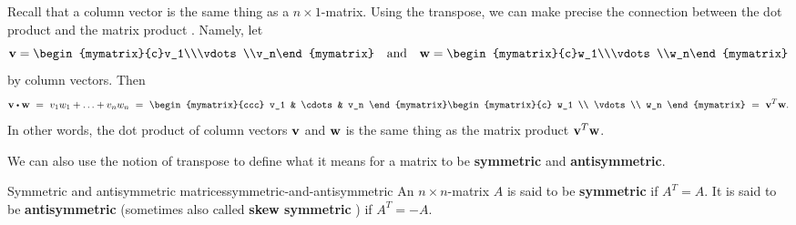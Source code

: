 Recall that a column vector is the same thing as a $n\times
1$-matrix. Using the transpose, we can make precise the connection
between the dot product and the matrix product%
%
. Namely, let
\begin{equation*}
  \vect{v}=\begin{mymatrix}{c}v_1\\\vdots\\v_n\end{mymatrix}
  \quad\mbox{and}\quad
  \vect{w}=\begin{mymatrix}{c}w_1\\\vdots\\w_n\end{mymatrix}
\end{equation*}
by column vectors. Then
\begin{equation*}
  \vect{v}\dotprod\vect{w}
  ~=~
  v_1w_1 + \ldots + v_nw_n
  ~=~
  \begin{mymatrix}{ccc} v_1 & \cdots & v_n \end{mymatrix}
  \begin{mymatrix}{c} w_1 \\ \vdots \\ w_n \end{mymatrix}
  ~=~
  \vect{v}^T\vect{w}.
\end{equation*}
In other words, the dot product of column vectors $\vect{v}$ and
$\vect{w}$ is the same thing as the matrix product
$\vect{v}^T\vect{w}$.

We can also use the notion of transpose to define what it means for a
matrix to be \textbf{symmetric} and \textbf{antisymmetric}.

\begin{definition}{Symmetric and antisymmetric matrices}{symmetric-and-antisymmetric}
  An $n\times n$-matrix $A$ is said to be \textbf{symmetric}%
   if $A^T=A$. It is said to be
  \textbf{antisymmetric}%
   (sometimes also called \textbf{skew
    symmetric}%
  ) if $A^T=-A$.
\end{definition}

